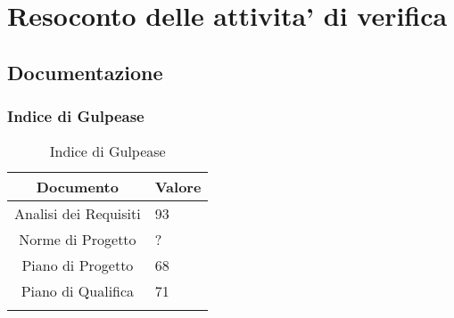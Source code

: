 \section{Resoconto delle attivita' di verifica}

\subsection{Documentazione}

\subsubsection{Indice di Gulpease}

\begin{table}[H]
	\centering
	\renewcommand\tabularxcolumn[1]{>{\Centering}m{#1}}
	\begin{tabularx}{\textwidth}{| c | X |} 
	\hline
	\textbf{Documento} & \textbf{Valore}\\
	\hline
	Analisi dei Requisiti & 93 \\
     	\hline
	Norme di Progetto & ?\\
	\hline
	Piano di Progetto & 68\\
	\hline
	Piano di Qualifica & 71\\
	\hline
    	\caption{Indice di Gulpease}
	\end{tabularx}
\end{table}
